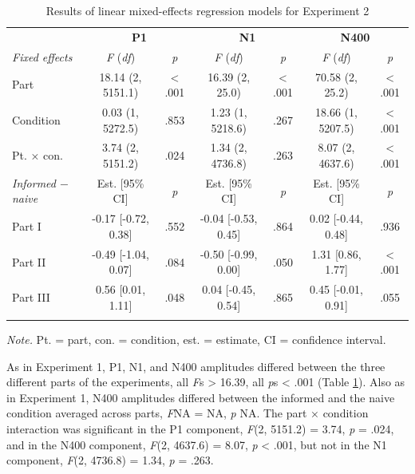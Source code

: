 \documentclass[
  english,
  man,11pt,floatsintext]{apa7}
\begin{document}
\begin{table}[tbp]

\begin{center}
\begin{threeparttable}

\caption{\label{tab:exp2-table}Results of linear mixed-effects regression models for Experiment 2}

\footnotesize{

\begin{tabular}{lcccccc}
\toprule
 & \multicolumn{2}{c}{\textbf{P1}} & \multicolumn{2}{c}{\textbf{N1}} & \multicolumn{2}{c}{\textbf{N400}} \\
\cmidrule(r){2-3} \cmidrule(r){4-5} \cmidrule(r){6-7}
\textit{Fixed effects} & \textit{F} (\textit{df}) & \textit{p} & \textit{F} (\textit{df}) & \textit{p} & \textit{F} (\textit{df}) & \textit{p}\\
\midrule
Part & 18.14 (2, 5151.1) & < .001 & 16.39 (2, 25.0) & < .001 & 70.58 (2, 25.2) & < .001\\
Condition & 0.03 (1, 5272.5) & .853 & 1.23 (1, 5218.6) & .267 & 18.66 (1, 5207.5) & < .001\\
Pt. × con. & 3.74 (2, 5151.2) & .024 & 1.34 (2, 4736.8) & .263 & 8.07 (2, 4637.6) & < .001\\
\textit{Informed $-$  naive} & Est. [95\% CI] & \textit{p} & Est. [95\% CI] & \textit{p} & Est. [95\% CI] & \textit{p}\\ \midrule
Part I & -0.17 [-0.72, 0.38] & .552 & -0.04 [-0.53, 0.45] & .864 & 0.02 [-0.44, 0.48] & .936\\
Part II & -0.49 [-1.04, 0.07] & .084 & -0.50 [-0.99, 0.00] & .050 & 1.31 [0.86, 1.77] & < .001\\
Part III & 0.56 [0.01, 1.11] & .048 & 0.04 [-0.45, 0.54] & .865 & 0.45 [-0.01, 0.91] & .055\\
\bottomrule
\addlinespace
\end{tabular}

}

\begin{tablenotes}[para]
\normalsize{\textit{Note.} Pt. = part, con. = condition, est. = estimate, CI = confidence interval.}
\end{tablenotes}

\end{threeparttable}
\end{center}

\end{table}

As in Experiment 1, P1, N1, and N400 amplitudes differed between the three different parts of the experiments, all \emph{F}s \textgreater{} 16.39, all \emph{p}s \textless{} .001 (Table \ref{tab:exp2-table}). Also as in Experiment 1, N400 amplitudes differed between the informed and the naive condition averaged across parts, \emph{F}NA = NA, \emph{p} NA. The part × condition interaction was significant in the P1 component, \emph{F}(2, 5151.2) = 3.74, \emph{p} = .024, and in the N400 component, \emph{F}(2, 4637.6) = 8.07, \emph{p} \textless{} .001, but not in the N1 component, \emph{F}(2, 4736.8) = 1.34, \emph{p} = .263.
\end{document}

